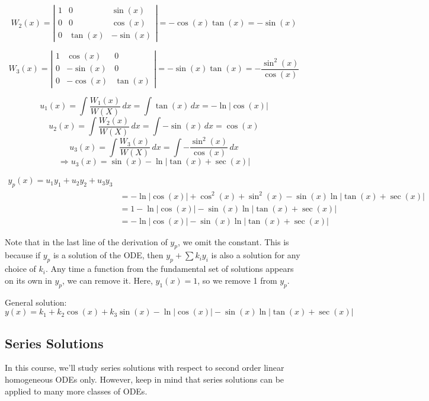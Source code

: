 \documentclass[11pt]{article}
\begin{document}
		$$ W_2(x) =
			\left|
				\begin{array}{ccc}
					1 & 0 & \sin(x) \\
					0 & 0 & \cos(x) \\
					0 & \tan(x) & - \sin(x)
				\end{array}
			\right|
			= - \cos(x) \tan(x) = - \sin(x)
		$$

		$$ W_3 (x) =
			\left|
				\begin{array}{ccc}
					1 & \cos(x) & 0 \\
					0 & - \sin(x) & 0 \\
					0 & - \cos(x) & \tan(x)
				\end{array}
			\right|
			= - \sin(x) \tan(x) = - \frac{\sin^2 (x)}{\cos(x)}
		$$

		$$ u_1 (x) = \int \frac{W_1 (x)}{W(X)} \,dx = \int \tan(x) \, dx = - \ln|\cos(x)| $$
		$$ u_2 (x) = \int \frac{W_2 (x)}{W(X)} \,dx = \int - \sin(x) \,dx = \cos(x) $$
		$$ u_3 (x) = \int \frac{W_3 (x)}{W(X)} \,dx = \int - \frac{\sin^2 (x)}{\cos(x)} \, dx $$
		$$ \Rightarrow u_3 (x) = \sin (x) - \ln|\tan(x) + \sec(x)| $$

		 \begin{align*}
		 	y_p (x) = u_1 y_1 + u_2 y_2 + u_3 y_3  \\
				&= - \ln|\cos(x)| + \cos^2 (x) + \sin^2 (x) - \sin(x) \ln|\tan(x) + \sec(x)| \\
				&= 1 - \ln|\cos(x)| - \sin(x) \ln|\tan(x) + \sec(x)| \\
				&= - \ln|\cos(x)| - \sin(x) \ln|\tan(x) + \sec(x)|
		\end{align*}

	Note that in the last line of the derivation of $y_p$, we omit the constant. This is because if $y_p$ is a solution of the ODE, then $y_p + \sum k_i y_i$ is also a solution for any choice of $k_i$. Any time a function from the fundamental set of solutions appears on its own in $y_p$, we can remove it. Here, $y_1 (x) = 1$, so we remove 1 from $y_p$.

	General solution:
		$$ y(x) = k_1 + k_2 \cos(x) + k_3 \sin(x) - \ln|\cos(x)| - \sin(x) \ln|\tan(x) + \sec(x)| $$

\subsection{Series Solutions}

	In this course, we'll study series solutions with respect to second order linear homogeneous ODEs only. However, keep in mind that series solutions can be applied to many more classes of ODEs.
\end{document}
